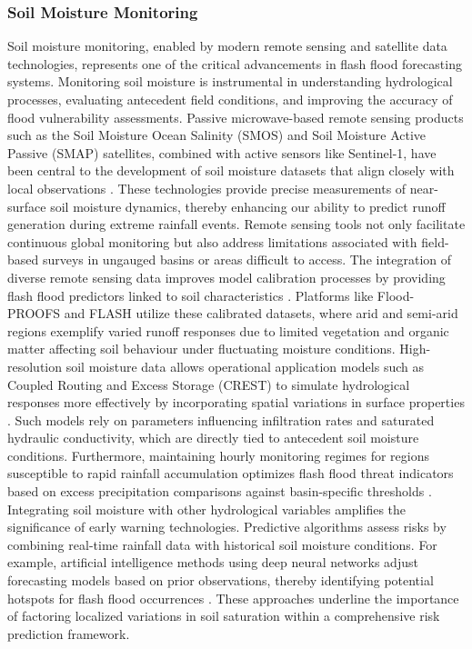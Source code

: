 \subsubsection{Soil Moisture Monitoring}
Soil moisture monitoring, enabled by modern remote sensing and satellite data technologies, represents one of the critical advancements in flash flood forecasting systems. Monitoring soil moisture is instrumental in understanding hydrological processes, evaluating antecedent field conditions, and improving the accuracy of flood vulnerability assessments. Passive microwave-based remote sensing products such as the Soil Moisture Ocean Salinity (SMOS) and Soil Moisture Active Passive (SMAP) satellites, combined with active sensors like Sentinel-1, have been central to the development of soil moisture datasets that align closely with local observations \citep{Zanchetta2020}. These technologies provide precise measurements of near-surface soil moisture dynamics, thereby enhancing our ability to predict runoff generation during extreme rainfall events.
Remote sensing tools not only facilitate continuous global monitoring but also address limitations associated with field-based surveys in ungauged basins or areas difficult to access. The integration of diverse remote sensing data improves model calibration processes by providing flash flood predictors linked to soil characteristics \citep{Hinge2024}. Platforms like Flood-PROOFS and FLASH utilize these calibrated datasets, where arid and semi-arid regions exemplify varied runoff responses due to limited vegetation and organic matter affecting soil behaviour under fluctuating moisture conditions.
High-resolution soil moisture data allows operational application models such as Coupled Routing and Excess Storage (CREST) to simulate hydrological responses more effectively by incorporating spatial variations in surface properties \citep{Zanchetta2020}. Such models rely on parameters influencing infiltration rates and saturated hydraulic conductivity, which are directly tied to antecedent soil moisture conditions. Furthermore, maintaining hourly monitoring regimes for regions susceptible to rapid rainfall accumulation optimizes flash flood threat indicators based on excess precipitation comparisons against basin-specific thresholds \citep{Poolman2014}.
Integrating soil moisture with other hydrological variables amplifies the significance of early warning technologies. Predictive algorithms assess risks by combining real-time rainfall data with historical soil moisture conditions. For example, artificial intelligence methods using deep neural networks adjust forecasting models based on prior observations, thereby identifying potential hotspots for flash flood occurrences \citep{Yang2022}. These approaches underline the importance of factoring localized variations in soil saturation within a comprehensive risk prediction framework.
